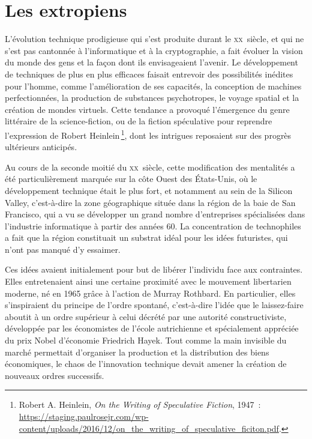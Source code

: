 \documentclass[a4paper,notitlepage]{article}
\newcommand{\eng}[1]{{\NoAutoSpaceBeforeFDP\emph{#1}}}  %
\newcommand{\sfootnote}{\,\footnote}
\begin{document}
\section{Les extropiens}

L'évolution technique prodigieuse qui s'est produite durant le \textsc{xx}\ieme{}~siècle, et qui ne s'est pas cantonnée à l'informatique et à la cryptographie, a fait évoluer la vision du monde des gens et la façon dont ils envisageaient l'avenir. Le développement de techniques de plus en plus efficaces faisait entrevoir des possibilités inédites pour l'homme, comme l'amélioration de ses capacités, la conception de machines perfectionnées, la production de substances psychotropes, le voyage spatial et la création de mondes virtuels. Cette tendance a provoqué l'émergence du genre littéraire de la science-fiction, ou de la fiction spéculative pour reprendre l'expression de Robert Heinlein\sfootnote{Robert A. Heinlein, \eng{On the Writing of Speculative Fiction}, 1947~: \url{https://staging.paulrosejr.com/wp-content/uploads/2016/12/on_the_writing_of_speculative_ficiton.pdf}.}, dont les intrigues reposaient sur des progrès ultérieurs anticipés.


Au cours de la seconde moitié du \textsc{xx}\ieme{}~siècle, cette modification des mentalités a été particulièrement marquée sur la côte Ouest des États-Unis, où le développement technique était le plus fort, et notamment au sein de la Silicon Valley, c'est-à-dire la zone géographique située dans la région de la baie de San Francisco, qui a vu se développer un grand nombre d'entreprises spécialisées dans l'industrie informatique à partir des années 60. La concentration de technophiles a fait que la région constituait un substrat idéal pour les idées futuristes, qui n'ont pas manqué d'y essaimer.

Ces idées avaient initialement pour but de libérer l'individu face aux contraintes. Elles entretenaient ainsi une certaine proximité avec le mouvement libertarien moderne, né en 1965 grâce à l'action de Murray Rothbard. En particulier, elles s'inspiraient du principe de l'ordre spontané, c'est-à-dire l'idée que le laissez-faire aboutit à un ordre supérieur à celui décrété par une autorité constructiviste, développée par les économistes de l'école autrichienne et spécialement appréciée du prix Nobel d'économie Friedrich Hayek. Tout comme la main invisible du marché permettait d'organiser la production et la distribution des biens économiques, le chaos de l'innovation technique devait amener la création de nouveaux ordres successifs.
\end{document}
